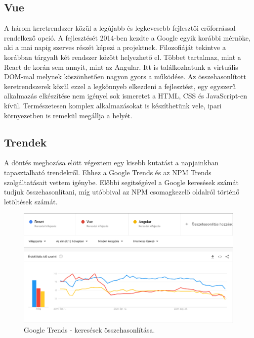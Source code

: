 \subsection{Vue}
A három keretrendszer közül a legújabb és legkevesebb fejlesztői erőforrással rendelkező opció.
A fejlesztését 2014-ben kezdte a Google egyik korábbi mérnöke, aki a mai napig szerves részét képezi a projektnek.
Filozofiáját tekintve a korábban tárgyalt két rendszer között helyezhető el. Többet tartalmaz, mint a React de korán sem annyit, mint az Angular. Itt is találkozhatunk a virtuális DOM-mal melynek köszönhetően nagyon gyors a működése.
Az összehasonlított keretrendszerek közül ezzel a legkönnyeb elkezdeni a fejlesztést, egy egyszerű alkalmazás elkészítése nem igényel sok ismeretet a HTML, CSS és JavaScript-en kívül. Természetesen komplex alkalmazásokat is készíthetünk vele, ipari környezetben is remekül megállja a helyét. 

\subsection{Trendek}
A döntés meghozása elött végeztem egy kisebb kutatást a napjainkban tapasztalható trendekről. Ehhez a Google Trends és az NPM Trends szolgáltatásait vettem igénybe. Előbbi segitségével a Google keresések számát tudjuk összehasonlítani, míg utóbbival az NPM csomagkezelő oldalról történő letöltések számát.

\begin{figure}[!ht]
  \centering
  \includegraphics[width=150mm, keepaspectratio]{figures/google_trends.png}
  \caption{Google Trends - keresések összehasonlítása.}
  \label{fig:GoogleTrends}
\end{figure}

